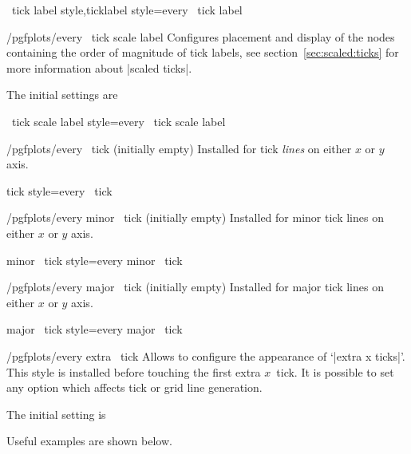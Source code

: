 \pgfplotsshortxystylekeys \x\ tick label style,\x ticklabel style=every \x\ tick label\pgfeov

\begin{xystylekey}{/pgfplots/every \x\ tick scale label}
 Configures placement and display of the nodes containing the order of magnitude of tick labels, see section~\ref{sec:scaled:ticks} for more information about |scaled ticks|.

The initial settings are
\begin{codeexample}
\end{codeexample}
\end{xystylekey}

\pgfplotsshortxystylekey \x\ tick scale label style=every \x\ tick scale label\pgfeov

\begin{xystylekey}{/pgfplots/every \x\ tick (initially empty)}
	Installed for tick \emph{lines} on either $x$ or $y$ axis.
\end{xystylekey}

\pgfplotsshortxystylekey \x tick style=every \x\ tick\pgfeov

\begin{xystylekey}{/pgfplots/every minor \x\ tick (initially empty)}
	Installed for minor tick lines on either $x$ or $y$ axis.
\end{xystylekey}

\pgfplotsshortxystylekey minor \x\ tick style=every minor \x\ tick\pgfeov

\begin{xystylekey}{/pgfplots/every major \x\ tick (initially empty)}
	Installed for major tick lines on either $x$ or $y$ axis.
\end{xystylekey}
\pgfplotsshortxystylekey major \x\ tick style=every major \x\ tick\pgfeov

\begin{xystylekey}{/pgfplots/every extra \x\ tick}
 Allows to configure the appearance of `|extra x ticks|'. This style is installed before touching the first extra $x$~tick. It is possible to set any option which affects tick or grid line generation.

The initial setting is
\begin{codeexample}
\end{codeexample}

 Useful examples are shown below.
\begin{codeexample}
\end{codeexample}
\end{xystylekey}

